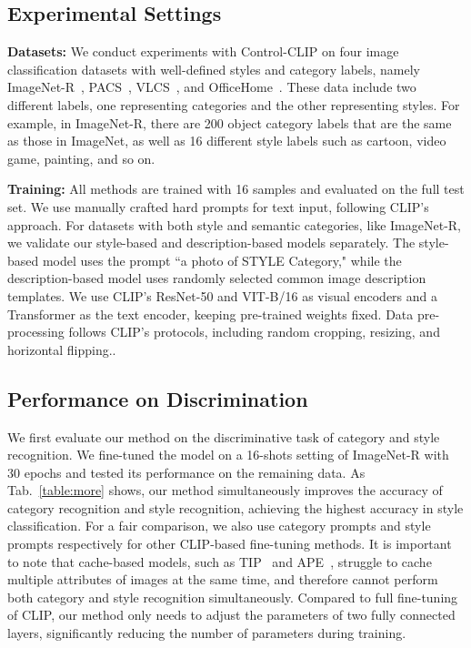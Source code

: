 \subsection{Experimental Settings}
\textbf{Datasets:} We conduct experiments with Control-CLIP on four image classification datasets with well-defined styles and category labels, namely ImageNet-R~\cite{hendrycks2021many}, PACS~\cite{li2017deeper}, VLCS~\cite{li2017deeper}, and OfficeHome~\cite{venkateswara2017deep}. These data include two different labels, one representing categories and the other representing styles. For example, in ImageNet-R, there are 200 object category labels that are the same as those in ImageNet, as well as 16 different style labels such as cartoon, video game, painting, and so on.

\textbf{Training:} All methods are trained with 16 samples and evaluated on the full test set. We use manually crafted hard prompts for text input, following CLIP's approach. For datasets with both style and semantic categories, like ImageNet-R, we validate our style-based and description-based models separately. The style-based model uses the prompt ``a photo of {STYLE} {Category}," while the description-based model uses randomly selected common image description templates. We use CLIP's ResNet-50 and VIT-B/16 as visual encoders and a Transformer as the text encoder, keeping pre-trained weights fixed. Data pre-processing follows CLIP's protocols, including random cropping, resizing, and horizontal flipping..
\subsection{Performance on Discrimination}
We first evaluate our method on the discriminative task of category and style recognition. We fine-tuned the model on a 16-shots setting of ImageNet-R with 30 epochs and tested its performance on the remaining data. As Tab.~\ref{table:more} shows, our method simultaneously improves the accuracy of category recognition and style recognition, achieving the highest accuracy in style classification. For a fair comparison, we also use category prompts and style prompts respectively for other CLIP-based fine-tuning methods. It is important to note that cache-based models, such as TIP~\cite{zhang2021tip} and APE~\cite{zhu2023not}, struggle to cache multiple attributes of images at the same time, and therefore cannot perform both category and style recognition simultaneously. Compared to full fine-tuning of CLIP, our method only needs to adjust the parameters of two fully connected layers, significantly reducing the number of parameters during training.

